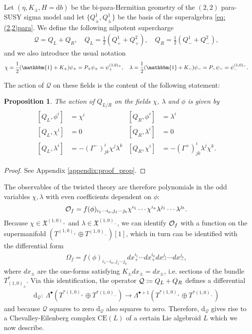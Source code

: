 \documentclass{article}
\newcommand{\XX}{\mathfrak{X}}
\newcommand{\QQ}{\mathcal{Q}}
\newcommand{\id}{\mathbbm{1}}
\newcommand{\rd}{\mathrm{d}}
\newtheorem{proposition}[theorem]{Proposition}
\theoremstyle{definition}
\theoremstyle{remark}
\begin{document}
Let $(\eta,K_\pm,H=\rd b)$ be the bi-para-Hermitian geometry of the $(2,2)$ para-SUSY sigma model and let $\{Q^1_\pm,Q^1_\pm\}$ be the basis of the superalgebra \eqref{eq:(2,2)para}. We define the following nilpotent supercharge
\begin{align}\label{QQ_nilpotent}
\QQ=Q_L+Q_R,\quad Q_L=\frac{1}{2}(Q^1_++Q^2_+),\quad Q_R=\frac{1}{2}(Q^1_-+Q^2_-),
\end{align}
and we also introduce the usual notation 
\begin{align*}
\chi=\frac{1}{2}(\id+K_+)\psi_+=P_+\psi_+=\psi_+^{(1,0)_+},\quad\lambda=\frac{1}{2}(\id+K_-)\psi_-=P_-\psi_-=\psi_-^{(1,0)_-}.
\end{align*}

The action of $\QQ$ on these fields is the content of the following statement:
\begin{proposition}\label{prop_toptwist}
The action of $Q_{L/R}$ on the fields $\chi$, $\lambda$ and $\phi$ is given by
\begin{align}\label{eq:Qcoh}
\begin{aligned}
[Q_L,\phi^i]&=\chi^i & [Q_R,\phi^i]&=\lambda^i\\
[Q_L,\chi^i]&=0 & [Q_R,\lambda^i]&=0\\
[Q_L,\lambda^i]&=-(\Gamma^-)^i_{jk}\chi^j\lambda^k & [Q_R,\chi^i]&=-(\Gamma^+)^i_{jk}\lambda^j\chi^k.
\end{aligned}
\end{align}
\end{proposition}
\begin{proof}
See Appendix \ref{appendix:proof_prop}.
\end{proof}

The observables of the twisted theory are therefore polynomials in the odd variables $\chi,\lambda$ with even coefficients dependent on $\phi$:
\begin{align*}
{\cal O}_f=f(\phi)_{i_1\cdots i_a,j_1\cdots j_b}\chi^{i_1}\cdots\chi^{i_a}\lambda^{j_1}\cdots\lambda^{j_b}.
\end{align*}
Because $\chi \in \XX^{(1,0)_+}$ and $\lambda \in \XX^{(1,0)_-}$, we can identify ${\cal O}_f$ with a function on the supermanifold $(T^{(1,0)_+}\oplus T^{(1,0)_-})[1]$, which in turn can be identified with the differential form
\begin{align*}
\Omega_f=f(\phi)_{i_1\cdots i_a,j_1\cdots j_b}dx^{i_1}_+\cdots dx^{i_a}_+ dx^{j_1}_- \cdots dx^{j_b}_-,
\end{align*}
where $dx_\pm$ are the one-forms satisfying $K_\pm dx_\pm=dx_\pm$, i.e. sections of the bundle $T^*_{(1,0)_\pm}$. Via this identification, the operator ${\cal Q}\coloneqq Q_L+Q_R$ defines a differential
\begin{align*}
\rd_\QQ:\ \Lambda^\bullet(T^{*(1,0)_+}\oplus T^{*(1,0)_-})\rightarrow \Lambda^{\bullet +1}(T^{*(1,0)_+}\oplus T^{*(1,0)_-})
\end{align*}
and because $\QQ$ squares to zero $\rd_\QQ$ also squares to zero. Therefore, $\rd_\QQ$ gives rise to a Chevalley-Eilenberg complex $\text{CE}(L)$ of a certain Lie algebroid $L$ which we now describe.
\end{document}
